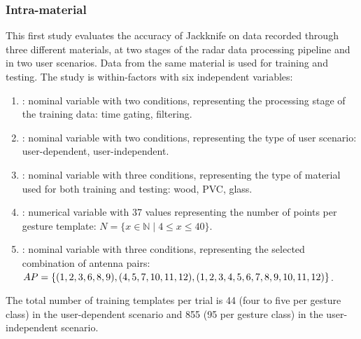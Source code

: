 \subsubsection{Intra-material} \label{sec:radar-experiments:through-materials:protocol:intra-material}
This first study evaluates the accuracy of Jackknife on data recorded through three different materials, at two stages of the radar data processing pipeline and in two user scenarios. Data from the same material is used for training and testing. The study is within-factors with six independent variables:
\begin{enumerate}
    \item {}: nominal variable with two conditions, representing the processing stage of the training data: time gating, filtering.
    \item {}: nominal variable with two conditions, representing the type of user scenario: user-dependent, user-independent.
    \item {}: nominal variable with three conditions, representing the type of material used for both training and testing: wood, PVC, glass.
    \item {}: numerical variable with 37 values representing the number of points per gesture template: $N{=}\{x\in\mathbb{N} \mid 4 \leq x \leq 40\}$.
    \item {}: nominal variable with three conditions, representing the selected combination of antenna pairs: $\splitatcommas{AP=\{(1, 2, 3, 6, 8, 9), (4, 5, 7, 10, 11, 12), (1, 2, 3, 4, 5, 6, 7, 8, 9, 10, 11, 12)\}}$.
\end{enumerate}
The total number of training templates per trial is 44 (four to five per gesture class) in the user-dependent scenario and 855 (95 per gesture class) in the user-independent scenario.

